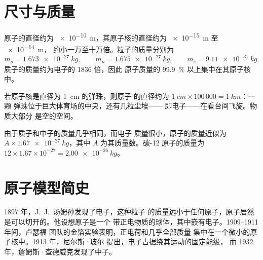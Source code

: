 \section{尺寸与质量}

\begin{proposition}\label{prop:g9:inside-the-atom:sizes}
原子的直径约为 \qty{e-10}{m}，其原子核的直径约为
\qty{e-15}{m} 至 \qty{e-14}{m}，
约小一万至十万倍。粒子的质量分别为
\[
  m_p = \qty{1.673e-27}{kg},\qquad m_n = \qty{1.675e-27}{kg},\qquad
  m_e = \qty{9.11e-31}{kg}.
\]
质子的质量约为电子的 1836 倍，因此
原子质量的 \qty{99.9}{\percent} 以上集中在其原子核中。
\end{proposition}

\begin{example}[体育场中的一颗弹珠]\label{ex:g9:inside-the-atom:marble}
若原子核是直径为 \qty{1}{cm} 的弹珠，则原子
的直径约为 $\qty{1}{cm} \times 100\,000 = \qty{1}{km}$：一颗
弹珠位于巨大体育场的中央，还有几粒尘埃——
即电子——在看台间飞旋。物质大部分
是空的空间。
\end{example}

\begin{method}[原子的质量]\label{met:g9:inside-the-atom:mass}
由于质子和中子的质量几乎相同，而电子
质量很小，原子的质量近似为 $A \times
\qty{1.67e-27}{kg}$，其中 $A$ 为其质量数。碳-12 原子的质量为
$12 \times 1.67 \times 10^{-27} = \qty{2.00e-26}{kg}$。
\end{method}

\section{原子模型简史}

\begin{history}[从不可分割到原子核，1897--1932]
1897 年，J.~J.~汤姆孙发现了电子，这种粒子
的质量远小于任何原子，原子居然是可以切开的。他设想原子是一个
带正电物质的球体，其中嵌有电子。1909--1911 年间，卢瑟福
团队的金箔实验表明，正电荷和几乎全部质量
集中在一个微小的原子核中。1913 年，尼尔斯·玻尔
提出，电子占据绕其运动的固定能级，
而 1932 年，詹姆斯·查德威克发现了中子。
\end{history}

